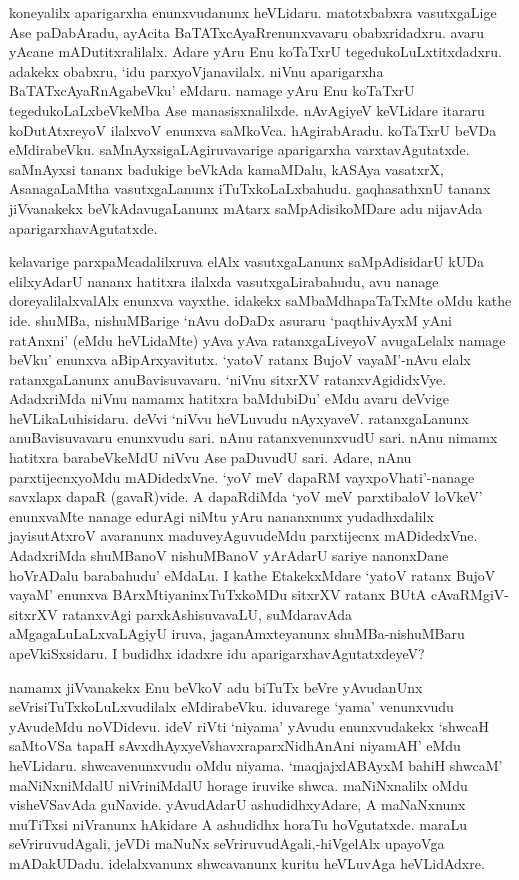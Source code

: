 koneyalilx aparigarxha enunxvudanunx heVLidaru. matotxbabxra vasutxgaLige Ase paDabAradu, ayAcita BaTATxcAyaRrenunxvavaru obabxridadxru. avaru yAcane mADutitxralilalx. Adare yAru Enu koTaTxrU tegedukoLuLxtitxdadxru. adakekx obabxru, `idu parxyoVjanavilalx. niVnu aparigarxha BaTATxcAyaRnAgabeVku' eMdaru. namage yAru Enu koTaTxrU tegedukoLaLxbeVkeMba Ase manasisxnalilxde. nAvAgiyeV keVLidare itararu koDutAtxreyoV ilalxvoV enunxva saMkoVca. hAgirabAradu. koTaTxrU beVDa eMdirabeVku. saMnAyxsigaLAgiruvavarige aparigarxha varxtavAgutatxde. saMnAyxsi tananx badukige beVkAda kamaMDalu, kASAya vasatxrX, AsanagaLaMtha vasutxgaLanunx iTuTxkoLaLxbahudu. gaqhasathxnU tananx jiVvanakekx beVkAdavugaLanunx mAtarx saMpAdisikoMDare adu nijavAda aparigarxhavAgutatxde.

kelavarige parxpaMcadalilxruva elAlx vasutxgaLanunx saMpAdisidarU kUDa elilxyAdarU nananx hatitxra ilalxda vasutxgaLirabahudu, avu nanage doreyalilalxvalAlx enunxva vayxthe. idakekx saMbaMdhapaTaTxMte oMdu kathe ide. shuMBa, nishuMBarige `nAvu doDaDx asuraru `paqthivAyxM yAni ratAnxni' (eMdu heVLidaMte) yAva yAva ratanxgaLiveyoV avugaLelalx namage beVku' enunxva aBipArxyavitutx. `yatoV ratanx BujoV vayaM'-nAvu elalx ratanxgaLanunx anuBavisuvavaru. `niVnu sitxrXV ratanxvAgididxVye. AdadxriMda niVnu namamx hatitxra baMdubiDu' eMdu avaru deVvige heVLikaLuhisidaru. deVvi `niVvu heVLuvudu nAyxyaveV. ratanxgaLanunx anuBavisuvavaru enunxvudu sari. nAnu ratanxvenunxvudU sari. nAnu nimamx hatitxra barabeVkeMdU niVvu Ase paDuvudU sari. Adare, nAnu parxtijecnxyoMdu mADidedxVne. `yoV meV dapaRM vayxpoVhati'-nanage savxlapx dapaR (gavaR)vide. A dapaRdiMda `yoV meV parxtibaloV loVkeV' enunxvaMte nanage edurAgi niMtu yAru nananxnunx yudadhxdalilx jayisutAtxroV avaranunx maduveyAguvudeMdu parxtijecnx mADidedxVne. AdadxriMda shuMBanoV nishuMBanoV yArAdarU sariye nanonxDane hoVrADalu barabahudu' eMdaLu. I kathe EtakekxMdare `yatoV ratanx BujoV vayaM' enunxva BArxMtiyaninxTuTxkoMDu sitxrXV ratanx BUtA cAvaRMgiV-sitxrXV ratanxvAgi parxkAshisuvavaLU, suMdaravAda aMgagaLuLaLxvaLAgiyU iruva, jaganAmxteyanunx shuMBa-nishuMBaru apeVkiSxsidaru. I budidhx idadxre idu aparigarxhavAgutatxdeyeV?

namamx jiVvanakekx Enu beVkoV adu biTuTx beVre yAvudanUnx seVrisiTuTxkoLuLxvudilalx eMdirabeVku. iduvarege `yama' venunxvudu yAvudeMdu noVDidevu. ideV riVti `niyama' yAvudu enunxvudakekx `shwcaH saMtoVSa tapaH sAvxdhAyxyeVshavxraparxNidhAnAni niyamAH' eMdu heVLidaru. shwcavenunxvudu oMdu niyama. `maqjajxlABAyxM bahiH shwcaM' maNiNxniMdalU niVriniMdalU horage iruvike shwca. maNiNxnalilx oMdu visheVSavAda guNavide. yAvudAdarU ashudidhxyAdare, A maNaNxnunx muTiTxsi niVranunx hAkidare A ashudidhx horaTu hoVgutatxde. maraLu seVriruvudAgali, jeVDi maNuNx seVriruvudAgali,-hiVgelAlx upayoVga mADakUDadu. idelalxvanunx shwcavanunx kuritu heVLuvAga heVLidAdxre.

